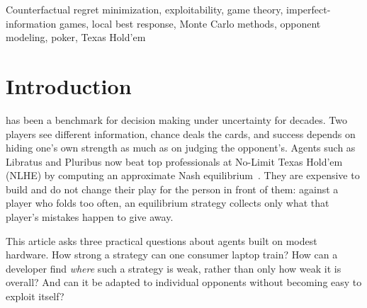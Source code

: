 \documentclass{ieeeaccess}
\begin{document}
\begin{keywords}
Counterfactual regret minimization, exploitability, game theory, imperfect-information games,
local best response, Monte Carlo methods, opponent modeling, poker, Texas Hold'em
\end{keywords}

\titlepgskip=-21pt

\maketitle

\section{Introduction}
\label{sec:introduction}
 has been a benchmark for decision making under uncertainty for decades. Two
players see different information, chance deals the cards, and success depends on hiding one's
own strength as much as on judging the opponent's. Agents such as Libratus and Pluribus now beat
top professionals at No-Limit Texas Hold'em (NLHE) by computing an approximate Nash
equilibrium~\cite{brown2018,brown2019}. They are expensive to build and do not change their
play for the person in front of them: against a player who folds too often, an equilibrium
strategy collects only what that player's mistakes happen to give away.

This article asks three practical questions about agents built on modest hardware. How strong a
strategy can one consumer laptop train? How can a developer find \emph{where} such a strategy is
weak, rather than only how weak it is overall? And can it be adapted to individual opponents
without becoming easy to exploit itself?
\end{document}
